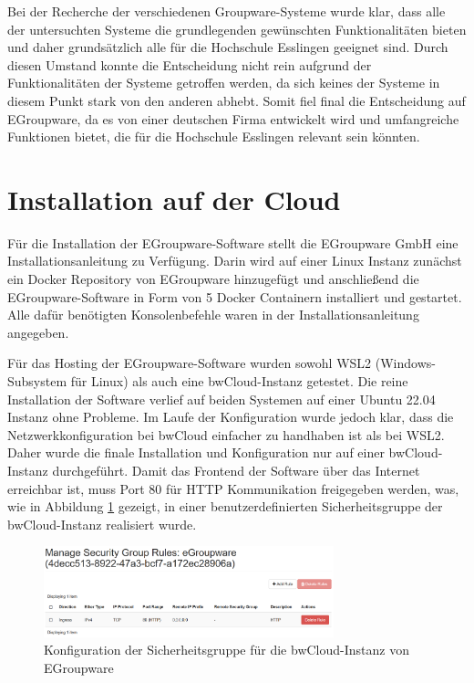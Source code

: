 Bei der Recherche der verschiedenen Groupware-Systeme wurde klar, dass alle der untersuchten Systeme die grundlegenden gewünschten Funktionalitäten bieten und daher grundsätzlich alle für die Hochschule Esslingen geeignet sind.
Durch diesen Umstand konnte die Entscheidung nicht rein aufgrund der Funktionalitäten der Systeme getroffen werden, da sich keines der Systeme in diesem Punkt stark von den anderen abhebt.
Somit fiel final die Entscheidung auf EGroupware, da es von einer deutschen Firma entwickelt wird und umfangreiche Funktionen bietet, die für die Hochschule Esslingen relevant sein könnten.




\section{Installation auf der Cloud}

Für die Installation der EGroupware-Software stellt die EGroupware GmbH eine Installationsanleitung zu Verfügung.
Darin wird auf einer Linux Instanz zunächst ein Docker Repository von EGroupware hinzugefügt und anschließend die EGroupware-Software in Form von 5 Docker Containern installiert und gestartet.
Alle dafür benötigten Konsolenbefehle waren in der Installationsanleitung angegeben. \autocite{egroupware-installation}

Für das Hosting der EGroupware-Software wurden sowohl WSL2 (Windows-Subsystem für Linux) als auch eine bwCloud-Instanz getestet.
Die reine Installation der Software verlief auf beiden Systemen auf einer Ubuntu 22.04 Instanz ohne Probleme.
Im Laufe der Konfiguration wurde jedoch klar, dass die Netzwerkkonfiguration bei bwCloud einfacher zu handhaben ist als bei WSL2.
Daher wurde die finale Installation und Konfiguration nur auf einer bwCloud-Instanz durchgeführt.
Damit das Frontend der Software über das Internet erreichbar ist, muss Port 80 für HTTP Kommunikation freigegeben werden, was, wie in Abbildung \ref{fig:bwcloud_security_group} gezeigt, in einer benutzerdefinierten Sicherheitsgruppe der bwCloud-Instanz realisiert wurde.
\begin{figure}[H]
    \centering
    \includegraphics[width=0.75\textwidth]{images/bwCloud_SecurityGroup.png}
    \caption{Konfiguration der Sicherheitsgruppe für die bwCloud-Instanz von EGroupware}
    \label{fig:bwcloud_security_group}
\end{figure}

